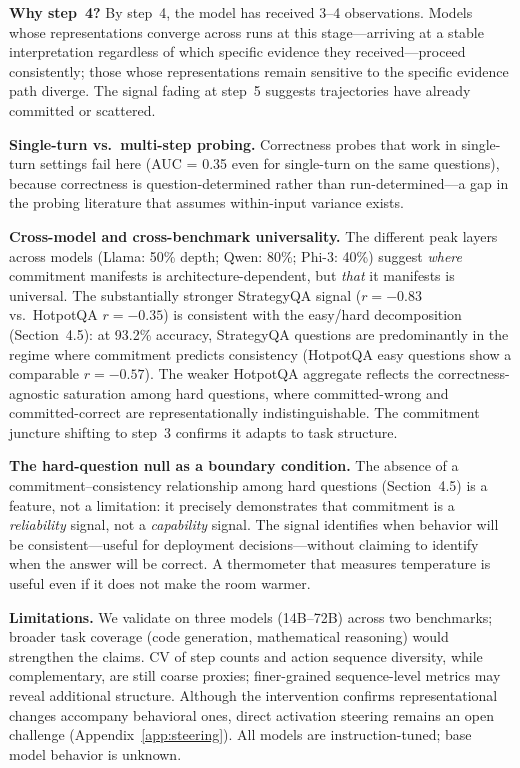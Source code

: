 \documentclass{article}
\begin{document}
\textbf{Why step~4?} By step~4, the model has received 3--4 observations. Models whose representations converge across runs at this stage---arriving at a stable interpretation regardless of which specific evidence they received---proceed consistently; those whose representations remain sensitive to the specific evidence path diverge. The signal fading at step~5 suggests trajectories have already committed or scattered.

\textbf{Single-turn vs.\ multi-step probing.} Correctness probes that work in single-turn settings \citep{gnosis, stickland2024reasoning} fail here (AUC = 0.35 even for single-turn on the same questions), because correctness is question-determined rather than run-determined---a gap in the probing literature that assumes within-input variance exists.

\textbf{Cross-model and cross-benchmark universality.} The different peak layers across models (Llama: 50\% depth; Qwen: 80\%; Phi-3: 40\%) suggest \emph{where} commitment manifests is architecture-dependent, but \emph{that} it manifests is universal. The substantially stronger StrategyQA signal ($r = -0.83$ vs.\ HotpotQA $r = -0.35$) is consistent with the easy/hard decomposition (Section~4.5): at 93.2\% accuracy, StrategyQA questions are predominantly in the regime where commitment predicts consistency (HotpotQA easy questions show a comparable $r = -0.57$). The weaker HotpotQA aggregate reflects the correctness-agnostic saturation among hard questions, where committed-wrong and committed-correct are representationally indistinguishable. The commitment juncture shifting to step~3 confirms it adapts to task structure.

\textbf{The hard-question null as a boundary condition.} The absence of a commitment--consistency relationship among hard questions (Section~4.5) is a feature, not a limitation: it precisely demonstrates that commitment is a \emph{reliability} signal, not a \emph{capability} signal. The signal identifies when behavior will be consistent---useful for deployment decisions---without claiming to identify when the answer will be correct. A thermometer that measures temperature is useful even if it does not make the room warmer.

\textbf{Limitations.} We validate on three models (14B--72B) across two benchmarks; broader task coverage (code generation, mathematical reasoning) would strengthen the claims. CV of step counts and action sequence diversity, while complementary, are still coarse proxies; finer-grained sequence-level metrics may reveal additional structure. Although the intervention confirms representational changes accompany behavioral ones, direct activation steering remains an open challenge (Appendix~\ref{app:steering}). All models are instruction-tuned; base model behavior is unknown.
\end{document}
